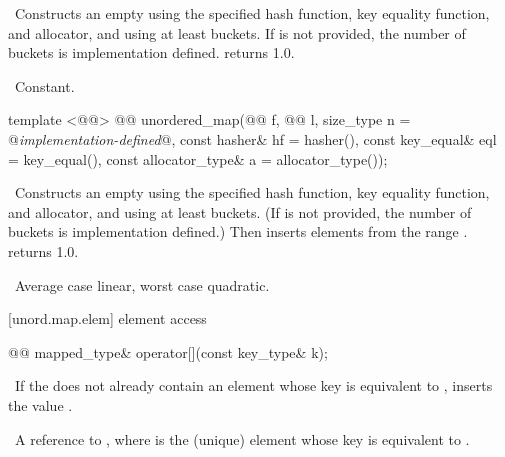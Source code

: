 \documentclass[american,twoside]{book}
\begin{document}
\begin{itemdescr}
\pnum
\effects\ Constructs an empty  using the
specified hash function, key equality function, and allocator, and
using at least \textit{} buckets.  If \textit{} is not
provided, the number of buckets is implementation defined.
 returns 1.0.

\pnum
\complexity\ Constant.
\end{itemdescr}

%
\begin{itemdecl}
template <@@>
  @@
  unordered_map(@@ f, @@ l,
                size_type n = @\textit{implementation-defined}@,
                const hasher& hf = hasher(),
                const key_equal& eql = key_equal(),
                const allocator_type& a = allocator_type());
\end{itemdecl}

\begin{itemdescr}
\pnum
\effects\ Constructs an empty  using the
specified hash function, key equality function, and allocator, and
using at least \textit{} buckets.  (If \textit{} is not
provided, the number of buckets is implementation defined.)  Then
inserts elements from the range \tcode{[\textit{f}, \textit{l})}.
 returns 1.0.

\pnum
\complexity\ Average case linear, worst case quadratic.
\end{itemdescr}

[unord.map.elem]{ element access}

%
%
%
\begin{itemdecl}
@@ mapped_type& operator[](const key_type& k);
\end{itemdecl}

\begin{itemdescr}
\pnum
\effects\ If the  does not already contain
an element whose key is equivalent to , inserts 
the value
.

\pnum
\returns\ A reference to , where 
is the (unique) element whose key is equivalent to .
\end{itemdescr}
\end{document}
